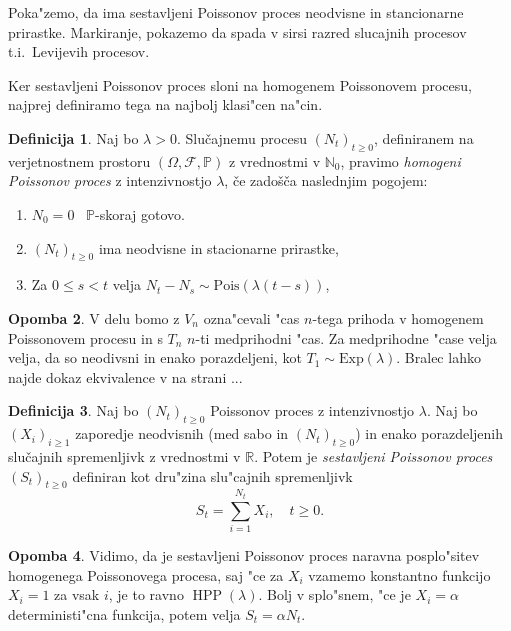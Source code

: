 \documentclass[12pt, a4paper, reqno]{amsart}
\theoremstyle{definition}
\newtheorem{definicija}{Definicija}[section]
\newtheorem{opomba}[definicija]{Opomba}
\theoremstyle{plain}
\newcommand{\N}{\mathbb{N}}
\newcommand{\Prob}{\mathbb{P}}
\newcommand{\1}{\mathds{1}}
\newcommand{\Pois}[1]{\text{Pois}(#1)}
\DeclareMathOperator{\HPP}{HPP}
\begin{document}
    Poka"zemo, da ima sestavljeni Poissonov proces neodvisne in stancionarne prirastke. Markiranje, pokazemo 
    da spada v sirsi razred slucajnih procesov t.i.\ Levijevih procesov. 
    
    Ker sestavljeni Poissonov proces
    sloni na homogenem Poissonovem procesu, najprej definiramo tega na najbolj klasi"cen na"cin.

    \begin{definicija}
        Naj bo $\lambda > 0$. Slučajnemu procesu $(N_t)_{t\geq 0}$, definiranem na verjetnostnem 
        prostoru $(\Omega, \mathcal{F}, \mathbb{P})$ z vrednostmi v $\N_0$, pravimo 
        \textit{homogeni Poissonov proces} z intenzivnostjo $\lambda$, če zadošča naslednjim pogojem:
        \begin{enumerate}
            \item $N_0 = 0$ \ $\Prob$-skoraj gotovo.
            \item $(N_t)_{t\geq 0}$ ima neodvisne in stacionarne prirastke,
            \item Za $0 \leq s < t$ velja $ N_t - N_s \sim\Pois{\lambda(t - s)}$,
        \end{enumerate}
        \label{def:HPP}
    \end{definicija}

    \begin{opomba}
    V delu bomo z $V_n$ ozna"cevali "cas $n$-tega prihoda v homogenem Poissonovem procesu in s $T_n$ $n$-ti 
    medprihodni "cas. Za medprihodne "case velja velja, da so neodivsni in enako porazdeljeni, kot 
    $T_1 \sim \text{Exp}(\lambda)$. Bralec lahko najde dokaz ekvivalence v \cite{7} na strani ...
    \end{opomba}

    \begin{definicija}
        Naj bo $(N_t)_{t\geq0}$ Poissonov proces z intenzivnostjo $\lambda$. 
        Naj bo $(X_i)_{i\geq1}$ zaporedje neodvisnih (med sabo in $(N_t)_{t\geq0}$) in enako 
        porazdeljenih slučajnih spremenljivk z vrednostmi v $\mathbb{R}$. Potem je 
        \textit{sestavljeni Poissonov proces} $(S_t)_{t\geq0}$ definiran kot dru"zina
        slu"cajnih spremenljivk
        $$
            S_t = \sum_{i=1}^{N_t} X_i, \quad t\geq0.
        $$
        \label{def:CPP}
    \end{definicija}

    \begin{opomba}
        Vidimo, da je sestavljeni Poissonov proces naravna posplo"sitev homogenega Poissonovega procesa, saj "ce za
        $X_i$ vzamemo konstantno funkcijo $X_i = 1$ za vsak $i$, je to ravno $\HPP(\lambda)$. Bolj v splo"snem, "ce je 
        $X_i = \alpha$ deterministi"cna funkcija, potem velja $S_t = \alpha N_t$.
        \label{op:CPPHPPPovezava}
    \end{opomba}
\end{document}
